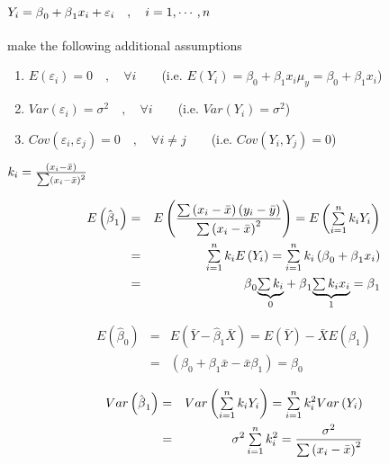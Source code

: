 \documentclass{article}
\begin{document}
\paragraph{$Y_{i}=\protect\beta _{0}+\protect\beta _{1}x_{i}+\protect%
\varepsilon _{i}\quad ,\quad i=1,\cdots ,n$}

make the following additional assumptions

\begin{enumerate}
\item $E\left( \varepsilon _{i}\right) =0\quad ,\quad \forall i\qquad $(i.e. 
$E\left( Y_{i}\right) =\beta _{0}+\beta _{1}x_{i}$\quad $\mu _{y}=\beta
_{0}+\beta _{1}x_{i}$)

\item $Var\left( \varepsilon _{i}\right) =\sigma ^{2}\quad ,\quad \forall
i\qquad $(i.e. $Var\left( Y_{i}\right) =\sigma ^{2}$)

\item $Cov\left( \varepsilon _{i},\varepsilon _{j}\right) =0\quad ,\quad
\forall i\neq j\qquad $(i.e. $Cov\left( Y_{i},Y_{j}\right) =0$)
\end{enumerate}

\bigskip

$k_{i}=\frac{\left( x_{i}-\bar{x}\right) }{\mathop{\textstyle \sum } \left( x_{i}-\bar{x}\right)
^{2}}$

\begin{eqnarray*}
E\left( \hat{\beta}_{1}\right) &=&E\left( \frac{\tsum \left( x_{i}-\bar{x}%
\right) \left( y_{i}-\bar{y}\right) }{\tsum \left( x_{i}-\bar{x}\right) ^{2}}%
\right) =E\left( \tsum\limits_{i=1}^{n}k_{i}Y_{i}\right) \\
&=&\tsum\limits_{i=1}^{n}k_{i}E\left( Y_{i}\right)
=\tsum\limits_{i=1}^{n}k_{i}\left( \beta _{0}+\beta _{1}x_{i}\right) \\
&=&\beta _{0}\underset{0}{\underbrace{\tsum k_{i}}}+\beta _{1}\underset{1}{%
\underbrace{\tsum k_{i}x_{i}}}=\beta _{1}
\end{eqnarray*}

\bigskip

\begin{eqnarray*}
E\left( \hat{\beta}_{0}\right) &=&E\left( \bar{Y}-\hat{\beta}_{1}\bar{X}%
\right) =E\left( \bar{Y}\right) -\bar{X}E\left( \hat{\beta}_{1}\right) \\
&=&\left( \beta _{0}+\beta _{1}\bar{x}-\bar{x}\beta _{1}\right) =\beta _{0}
\end{eqnarray*}

\begin{eqnarray*}
Var\left( \hat{\beta}_{1}\right) &=&Var\left(
\tsum\limits_{i=1}^{n}k_{i}Y_{i}\right)
=\tsum\limits_{i=1}^{n}k_{i}^{2}Var\left( Y_{i}\right) \\
&=&\sigma ^{2}\tsum\limits_{i=1}^{n}k_{i}^{2}=\frac{\sigma ^{2}}{\tsum
\left( x_{i}-\bar{x}\right) ^{2}}
\end{eqnarray*}
\end{document}
